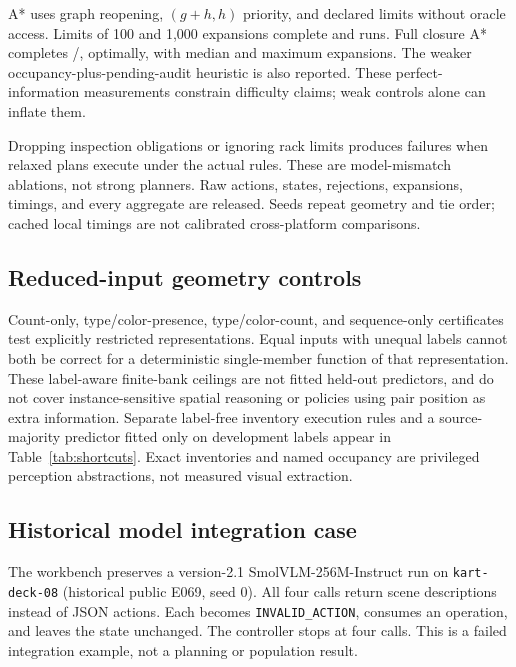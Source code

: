 \documentclass[10pt,twocolumn,letterpaper]{article}
\begin{document}
A* uses graph reopening, $(g+h,h)$ priority, and declared limits without
oracle access. Limits of 100 and 1,000 expansions complete
\BoundedSmallCompleted{} and \BoundedLargeCompleted{} runs.
Full closure A* completes \FullSearchCompleted{}/\FullSearchAssigned{},
\FullSearchOptimal{} optimally, with median \FullSearchMedianExpansions{}
and maximum \FullSearchMaxExpansions{} expansions.
The weaker occupancy-plus-pending-audit
heuristic is also reported. These perfect-information measurements
constrain difficulty claims; weak controls alone can inflate them.

Dropping inspection obligations or ignoring rack limits produces
failures when relaxed plans execute under the actual rules. These are
model-mismatch ablations, not strong planners. Raw actions, states,
rejections, expansions, timings, and every aggregate are released.
Seeds repeat geometry and tie order; cached local timings are not
calibrated cross-platform comparisons.

\subsection{Reduced-input geometry controls}
\begin{table}[t]
\centering\small
\caption{Primary inventory-matched geometry: deterministic software rules,
not visual performance. Joint correctness requires both exact labels.
Intervals resample whole source groups; unavailable estimates are marked
unavailable, never inferred as zero.}

\label{tab:shortcuts}
\end{table}
Count-only, type/color-presence, type/color-count, and sequence-only
certificates test explicitly restricted representations. Equal inputs with
unequal labels cannot both be correct for a deterministic single-member
function of that representation. These label-aware finite-bank ceilings
are not fitted held-out predictors, and do not cover instance-sensitive
spatial reasoning or policies using pair position as extra information.
Separate label-free inventory execution rules and a source-majority
predictor fitted only on development labels appear in
Table~\ref{tab:shortcuts}. Exact inventories and named occupancy are
privileged perception abstractions, not measured visual extraction.

\subsection{Historical model integration case}
The workbench preserves a version-2.1 SmolVLM-256M-Instruct run on
\texttt{kart-deck-08} (historical public E069, seed 0). All four calls
return scene descriptions instead of JSON actions. Each becomes
\texttt{INVALID\_ACTION}, consumes an operation, and leaves the state
unchanged. The controller stops at four calls. This is a failed
integration example, not a planning or population result.
\end{document}
